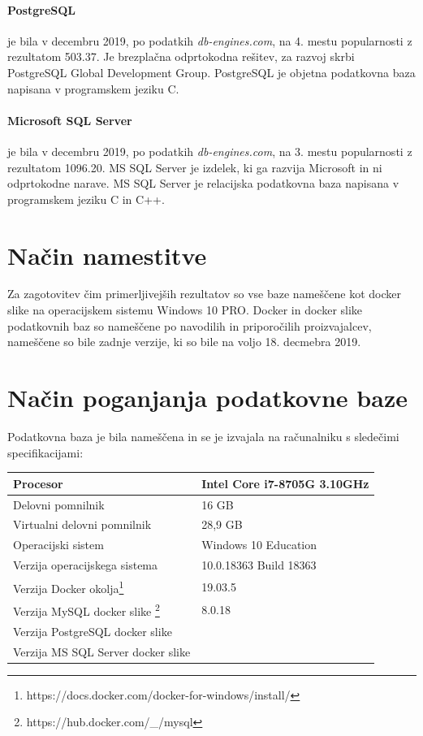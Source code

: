 \documentclass[a4paper,12pt]{report}
\begin{document}
\paragraph{PostgreSQL} je bila v decembru 2019, po podatkih \textit{db-engines.com}, na 4. mestu popularnosti z rezultatom 503.37. 
Je brezplačna odprtokodna rešitev, za razvoj skrbi PostgreSQL Global Development Group. PostgreSQL je objetna podatkovna baza napisana v programskem jeziku C.

\paragraph{Microsoft SQL Server} je bila v decembru 2019, po podatkih \textit{db-engines.com}, na 3. mestu popularnosti z rezultatom 1096.20.
MS SQL Server je izdelek, ki ga razvija Microsoft in ni odprtokodne narave. MS SQL Server je relacijska podatkovna baza napisana v programskem jeziku C in C++.

\section{Način namestitve}
Za zagotovitev čim primerljivejših rezultatov so vse baze nameščene kot docker slike na operacijskem sistemu Windows 10 PRO. 
Docker in docker slike podatkovnih baz so nameščene po navodilih in priporočilih proizvajalcev, nameščene so bile zadnje verzije, ki so bile
na voljo 18. decmebra 2019.

\section{Način poganjanja podatkovne baze}
Podatkovna baza je bila nameščena in se je izvajala na računalniku s sledečimi specifikacijami:

\begin{center}
    \begin{tabular}{||l|l||}
        \hline
        Procesor & Intel Core i7-8705G 3.10GHz\\
        \hline
        Delovni pomnilnik & 16 GB\\
        \hline
        Virtualni delovni pomnilnik & 28,9 GB\\
        \hline
        Operacijski sistem & Windows 10 Education\\
        \hline
        Verzija operacijskega sistema & 10.0.18363 Build 18363\\
        \hline
        Verzija Docker okolja\footnote{https://docs.docker.com/docker-for-windows/install/} & 19.03.5\\
        \hline
        Verzija MySQL docker slike \footnote{https://hub.docker.com/\_/mysql} & 8.0.18 \\
        \hline
        Verzija PostgreSQL docker slike & \\
        \hline
        Verzija MS SQL Server docker slike & \\
        \hline
    \end{tabular}
\end{center}
\end{document}
